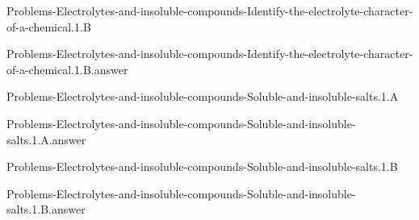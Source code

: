 \documentclass[main.tex]{subfiles}
\newcommand\chapterlabel{}
\begin{document}
\renewcommand\chapterlabel{Ch-electrolytes}
\begin{question}[ID=\the\value{numA}]
{Problems-Electrolytes-and-insoluble-compounds-Identify-the-electrolyte-character-of-a-chemical.1.B}
\end{question}
   \begin{Form}
   \TextField[multiline,backgroundcolor=gray!20,borderwidth=0,width=0.43\textwidth  ,height=115pt, name=\the\value{numA}]  { }\end{Form}
\begin{solution}
{Problems-Electrolytes-and-insoluble-compounds-Identify-the-electrolyte-character-of-a-chemical.1.B.answer}
\hspace{0.1cm}
\end{solution}


\renewcommand\chapterlabel{Ch-electrolytes}
\begin{question}[ID=\the\value{numA}]
{Problems-Electrolytes-and-insoluble-compounds-Soluble-and-insoluble-salts.1.A}
\end{question}
   \begin{Form}
   \TextField[multiline,backgroundcolor=gray!20,borderwidth=0,width=0.43\textwidth  ,height=115pt, name=\the\value{numA}]  { }\end{Form}
\begin{solution}
{Problems-Electrolytes-and-insoluble-compounds-Soluble-and-insoluble-salts.1.A.answer}
\hspace{0.1cm}
\end{solution}


\renewcommand\chapterlabel{Ch-electrolytes}
\begin{question}[ID=\the\value{numA}]
{Problems-Electrolytes-and-insoluble-compounds-Soluble-and-insoluble-salts.1.B}
\end{question}
   \begin{Form}
   \TextField[multiline,backgroundcolor=gray!20,borderwidth=0,width=0.43\textwidth  ,height=115pt, name=\the\value{numA}]  { }\end{Form}
\begin{solution}
{Problems-Electrolytes-and-insoluble-compounds-Soluble-and-insoluble-salts.1.B.answer}
\hspace{0.1cm}
\end{solution}
\end{document}
